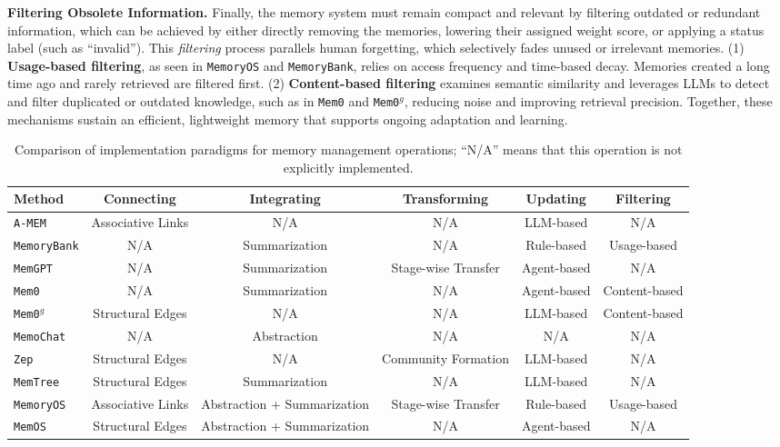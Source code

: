  \textbf{Filtering Obsolete Information.}  
Finally, the memory system must remain compact and relevant by filtering outdated or redundant information, which can be achieved by either directly removing the memories, lowering their assigned weight score, or applying a status label (such as ``invalid''). This \textit{filtering} process parallels human forgetting, which selectively fades unused or irrelevant memories.  
(1) \textbf{Usage-based filtering}, as seen in {\tt MemoryOS} and {\tt MemoryBank}, relies on access frequency and time-based decay. Memories created a long time ago and rarely retrieved are filtered first.  
(2) \textbf{Content-based filtering} examines semantic similarity and leverages LLMs to detect and filter duplicated or outdated knowledge, such as in {\tt Mem0} and {\tt Mem0$^g$}, reducing noise and improving retrieval precision.  
Together, these mechanisms sustain an efficient, lightweight memory that supports ongoing adaptation and learning.


\begin{table}[]
  \centering
  \caption{Comparison of implementation paradigms for memory management operations; ``N/A'' means that this operation is not explicitly implemented.}
  \label{tab:management_methods}
  \begin{tabular}{l|c|c|c|c|c}
     \toprule
     \rowcolor{gray!20}
      \textbf{Method} & \textbf{Connecting} & \textbf{Integrating} & \textbf{Transforming} & \textbf{Updating}& \textbf{Filtering} \\
     \midrule
      {\tt A-MEM} & Associative Links & N/A & N/A & LLM-based & N/A \\
      {\tt MemoryBank} & N/A & Summarization & N/A & Rule-based & Usage-based \\
      {\tt MemGPT} & N/A & Summarization & Stage-wise Transfer & Agent-based & N/A \\
      {\tt Mem0} & N/A & Summarization & N/A & Agent-based & Content-based \\
      {\tt Mem0$^g$} & Structural Edges & N/A & N/A & LLM-based & Content-based \\
      {\tt MemoChat} & N/A & Abstraction & N/A & N/A & N/A \\
      {\tt Zep} & Structural Edges & N/A & Community Formation & LLM-based & N/A \\
      {\tt MemTree} & Structural Edges & Summarization & N/A & LLM-based & N/A \\
      {\tt MemoryOS} & Associative Links & Abstraction + Summarization & Stage-wise Transfer & Rule-based & Usage-based \\
      {\tt MemOS} & Structural Edges & Abstraction + Summarization & N/A & Agent-based & N/A \\
     \bottomrule
  \end{tabular}
\end{table}


